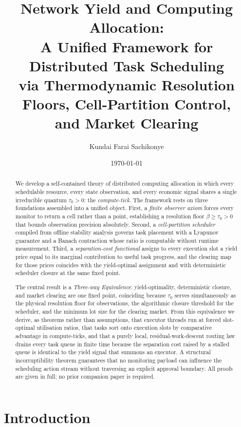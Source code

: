 \documentclass[11pt,twocolumn,a4paper]{article}
\title{\textbf{Network Yield and Computing Allocation:\\
A Unified Framework for Distributed Task Scheduling\\
via Thermodynamic Resolution Floors, Cell-Partition Control,\\
and Market Clearing}}
\author{Kundai Farai Sachikonye}
\date{\today}
\theoremstyle{plain}
\theoremstyle{definition}
\theoremstyle{remark}
\newcommand{\tick}{\tau_0}
\newcommand{\floor}{\beta}
\begin{document}
\maketitle

\begin{abstract}
We develop a self-contained theory of distributed computing allocation in which every schedulable resource, every state observation, and every economic signal shares a single irreducible quantum $\tick > 0$: the \emph{compute-tick}. The framework rests on three foundations assembled into a unified object. First, a \emph{finite observer axiom} forces every monitor to return a cell rather than a point, establishing a resolution floor $\floor \geq \tick > 0$ that bounds observation precision absolutely. Second, a \emph{cell-partition scheduler} compiled from offline stability analysis governs task placement with a Lyapunov guarantee and a Banach contraction whose ratio is computable without runtime measurement. Third, a \emph{separation-cost functional} assigns to every execution slot a yield price equal to its marginal contribution to useful task progress, and the clearing map for those prices coincides with the yield-optimal assignment and with deterministic scheduler closure at the same fixed point.

The central result is a \emph{Three-way Equivalence}: yield-optimality, deterministic closure, and market clearing are one fixed point, coinciding because $\tick$ serves simultaneously as the physical resolution floor for observations, the algorithmic closure threshold for the scheduler, and the minimum lot size for the clearing market. From this equivalence we derive, as theorems rather than assumptions, that executor threads run at forced slot-optimal utilisation ratios, that tasks sort onto execution slots by comparative advantage in compute-ticks, and that a purely local, residual-work-descent routing law drains every task queue in finite time because the separation cost raised by a stalled queue is identical to the yield signal that summons an executor. A structural incorruptibility theorem guarantees that no monitoring payload can influence the scheduling action stream without traversing an explicit approval boundary. All proofs are given in full; no prior companion paper is required.
\end{abstract}

\tableofcontents

\section{Introduction}
\label{sec:intro}
\end{document}
